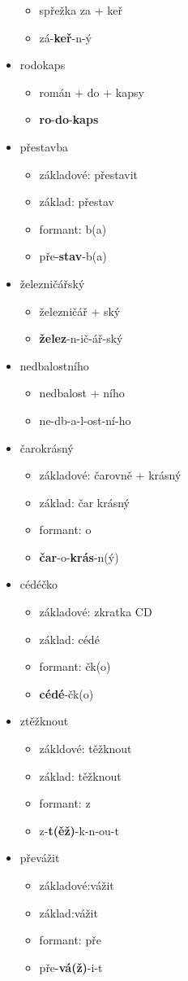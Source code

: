 \begin{itemize}
\begin{itemize}
	\item spřežka za + keř
	\item zá-\textbf{keř}-n-ý
	\end{itemize}
\item rodokaps
	\begin{itemize}
	\item román + do + kapsy
	\item \textbf{ro}-\textbf{do}-\textbf{kaps}
	\end{itemize}
\item přestavba
	\begin{itemize}
	\item základové: přestavit
	\item základ: přestav
	\item formant: b(a)
	\item pře-\textbf{stav}-b(a)
	\end{itemize}
\item železničářský
	\begin{itemize}
	\item železničář + ský
	\item \textbf{želez}-n-ič-ář-ský
	\end{itemize}
\item nedbalostního	
	\begin{itemize}
	\item nedbalost + ního
	\item ne-db-a-l-ost-ní-ho
	\end{itemize}
\item čarokrásný
	\begin{itemize}
	\item základové: čarovně + krásný
	\item základ: čar krásný
	\item formant: o
	\item \textbf{čar}-o-\textbf{krás}-n(ý)
	\end{itemize}
\item cédéčko
	\begin{itemize}
	\item základové: zkratka CD
	\item základ: cédé
	\item formant: čk(o)
	\item \textbf{cédé}-čk(o)
	\end{itemize}
\item ztěžknout
	\begin{itemize}
	\item zákldové: těžknout
	\item základ: těžknout
	\item formant: z
	\item z-\textbf{t(ěž)}-k-n-ou-t
	\end{itemize}
\item převážit
	\begin{itemize}
	\item základové:vážit
	\item základ:vážit
	\item formant: pře
	\item pře-\textbf{vá(ž)}-i-t
	\end{itemize}
\end{itemize}


